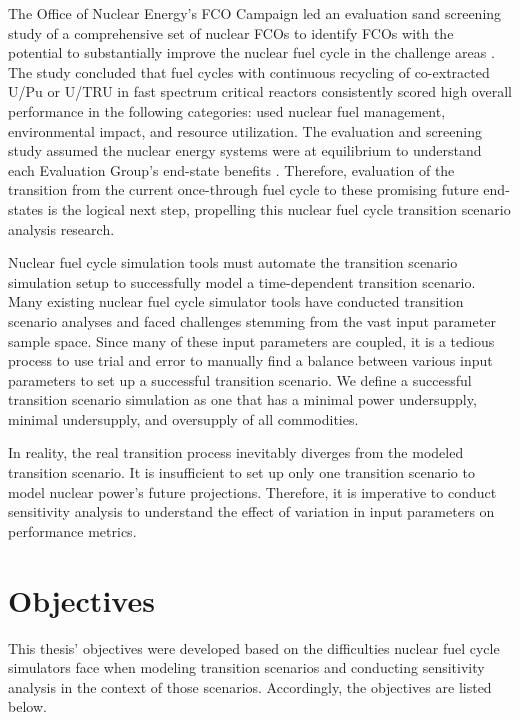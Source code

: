 The Office of Nuclear Energy's
\gls{FCO} Campaign led an evaluation 
sand screening study of a comprehensive set of nuclear \glspl{FCO} 
to identify \glspl{FCO} with the potential to substantially 
improve the nuclear fuel cycle in the challenge areas
\cite{wigeland_nuclear_2014}. 
The study concluded that fuel cycles with continuous recycling
of co-extracted U/Pu or U/TRU in fast spectrum critical reactors
consistently scored high overall performance in the following 
categories: used nuclear fuel management, environmental impact, 
and resource utilization. 
The evaluation and screening study assumed
the nuclear energy systems were at equilibrium to understand 
each Evaluation Group's
end-state benefits \cite{feng_standardized_2016}. 
Therefore, evaluation of the transition from the current 
once-through fuel cycle to these promising 
future end-states \cite{feng_standardized_2016} 
is the logical next step, propelling this
nuclear fuel cycle transition scenario analysis research. 

Nuclear fuel cycle simulation tools must automate the transition scenario simulation 
setup to successfully model a time-dependent transition scenario. 
Many existing nuclear fuel cycle simulator tools have conducted 
transition scenario analyses 
\cite{feng_standardized_2016,bae_standardized_2019,coquelet-pascal_cosi6:_2015}
and faced challenges stemming from the vast input parameter
sample space.
Since many of these input parameters are coupled, it is 
a tedious process to use trial and error to manually find a balance 
between various input parameters to set up a successful transition 
scenario. 
We define a successful transition scenario simulation as one that 
has a minimal power undersupply, minimal undersupply, 
and oversupply of all commodities. 
 
In reality, the real transition process inevitably diverges
from the modeled transition scenario. 
It is insufficient to set up only one transition scenario to model 
nuclear power's future projections.
Therefore, it is imperative to conduct sensitivity analysis to understand 
the effect of variation in input parameters on 
performance metrics. 

\section{Objectives}
This thesis' objectives were developed based on the difficulties 
nuclear fuel cycle simulators face when modeling transition scenarios 
and conducting sensitivity analysis in the context of those scenarios.
Accordingly, the objectives are listed below. 
